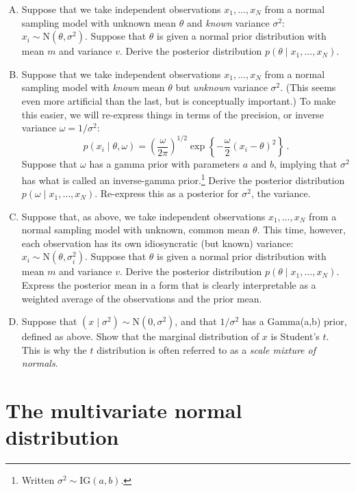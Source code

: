 \documentclass{mynotes}
\newcommand{\N}{\mbox{N}}
\begin{document}
\begin{enumerate}[(A)]
\item Suppose that we take independent observations $x_1, \ldots, x_N$ from a normal sampling model with unknown mean $\theta$ and \textit{known} variance $\sigma^2$: $x_i \sim \mbox{N}(\theta, \sigma^2)$.  Suppose that $\theta$ is given a normal prior distribution with mean $m$ and variance $v$.  Derive the posterior distribution $p(\theta \mid x_1, \ldots, x_N)$.

\item Suppose that we take independent observations $x_1, \ldots, x_N$ from a normal sampling model with \textit{known} mean $\theta$ but \textit{unknown} variance $\sigma^2$.  (This seems even more artificial than the last, but is conceptually important.)  To make this easier, we will re-express things in terms of the precision, or inverse variance $\omega = 1/\sigma^2$:
$$
p(x_i \mid \theta, \omega) = \left( \frac{\omega}{2 \pi} \right)^{1/2} \exp \left\{ -\frac{\omega}{2} (x_i - \theta)^2 \right\} \, .
$$
Suppose that $\omega$ has a gamma prior with parameters $a$ and $b$, implying that $\sigma^2$ has what is called an inverse-gamma prior.\footnote{Written $\sigma^2 \sim \mbox{IG}(a,b)$.}  Derive the posterior distribution $p(\omega \mid x_1, \ldots, x_N)$.  Re-express this as a posterior for $\sigma^2$, the variance.

\item Suppose that, as above, we take independent observations $x_1, \ldots, x_N$ from a normal sampling model with unknown, common mean $\theta$.  This time, however, each observation has its own idiosyncratic (but known) variance: $x_i \sim \mbox{N}(\theta, \sigma_i^2)$.  Suppose that $\theta$ is given a normal prior distribution with mean $m$ and variance $v$.  Derive the posterior distribution $p(\theta \mid x_1, \ldots, x_N)$.  Express the posterior mean in a form that is clearly interpretable as a weighted average of the observations and the prior mean.

\item Suppose that $(x \mid \sigma^2) \sim \N(0, \sigma^2)$, and that $1/ \sigma^2$ has a Gamma(a,b) prior, defined as above.  Show that the marginal distribution of $x$ is Student's $t$.  This is why the $t$ distribution is often referred to as a \textit{scale mixture of normals}.

\end{enumerate}



\section{The multivariate normal distribution}
\end{document}

